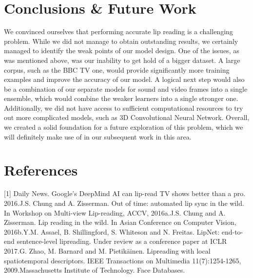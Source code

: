 \documentclass{article}[10pt]
\begin{document}
\begin{multicols}{2}
\section{Conclusions \& Future Work}
We convinced ourselves that performing accurate lip reading is a challenging
problem. While we did not manage to obtain outstanding results, we certainly
managed to identify the weak points of our model design. One of the issues, as
was mentioned above, was our inability to get hold of a bigger dataset. A large
corpus, such as the BBC TV one, would provide significantly more training examples
and improve the accuracy of our model. A logical next step would also be a
combination of our separate models for sound and video frames into a single
ensemble, which would combine the weaker learners into a single stronger one.
Additionally, we did not have access to sufficient computational resources to
try out more complicated models, such as 3D Convolutional Neural Network.
Overall, we created a solid foundation for a future exploration of this problem,
which we will definitely make use of in our subsequent work in this area.

\section{References}
[1] Daily News. Google’s DeepMind AI can lip-read TV shows better than a pro. 2016.\newline
[2] J.S. Chung and A. Zisserman. Out of time: automated lip sync in the wild. In Workshop on Multi-view
Lip-reading, ACCV, 2016a.\newline
[3] J.S. Chung and A. Zisserman. Lip reading in the wild. In Asian Conference on Computer Vision, 2016b.\newline
[4] Y.M. Assael, B. Shillingford, S. Whiteson and N. Freitas. LipNet: end-to-end sentence-level lipreading.
Under review as a conference paper at ICLR 2017.\newline
[5] G. Zhao, M. Barnard and M. Pietikäinen. Lipreading with local spatiotemporal descriptors.
IEEE Transactions on Multimedia 11(7):1254-1265, 2009.\newline
[6] Massachusetts Institute of Technology. Face Databases.
\end{multicols}
\end{document}
